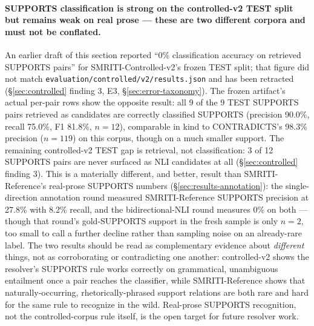 \paragraph{SUPPORTS classification is strong on the controlled-v2 TEST
split but remains weak on real prose --- these are two different corpora
and must not be conflated.} An earlier draft of this section reported
``0\% classification accuracy on retrieved SUPPORTS pairs'' for
SMRITI-Controlled-v2's frozen TEST split; that figure did not match
\texttt{evaluation/controlled/v2/results.json} and has been retracted
(\S\ref{sec:controlled} finding 3, E3, \S\ref{sec:error-taxonomy}). The
frozen artifact's actual per-pair rows show the opposite result: all 9
of the 9 TEST SUPPORTS pairs retrieved as candidates are correctly
classified SUPPORTS (precision 90.0\%, recall 75.0\%, F1 81.8\%,
$n=12$), comparable in kind to CONTRADICTS's 98.3\% precision
($n=119$) on this corpus, though on a much smaller support. The
remaining controlled-v2 TEST gap is retrieval, not classification: 3 of
12 SUPPORTS pairs are never surfaced as NLI candidates at all
(\S\ref{sec:controlled} finding 3). This is a materially different, and
better, result than SMRITI-Reference's real-prose SUPPORTS numbers
(\S\ref{sec:results-annotation}): the single-direction annotation round
measured SMRITI-Reference SUPPORTS precision at 27.8\% with 8.2\% recall,
and the bidirectional-NLI round measures 0\% on both --- though that
round's gold-SUPPORTS support in the fresh sample is only $n=2$, too
small to call a further decline rather than sampling noise on an
already-rare label. The two results should be read as complementary
evidence about \emph{different} things, not as corroborating or
contradicting one another: controlled-v2 shows the resolver's SUPPORTS
rule works correctly on grammatical, unambiguous entailment once a
pair reaches the classifier, while SMRITI-Reference shows that
naturally-occurring, rhetorically-phrased support relations are both
rare and hard for the same rule to recognize in the wild. Real-prose
SUPPORTS recognition, not the controlled-corpus rule itself, is the
open target for future resolver work.

